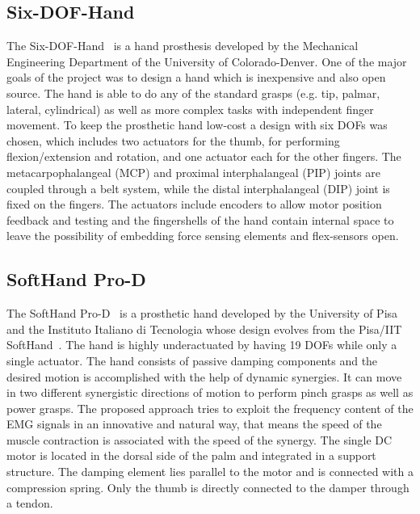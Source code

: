 \documentclass[a4paper, 10pt, conference]{ieeeconf}      %
\begin{document}
\subsection{Six-DOF-Hand}

The Six-DOF-Hand~\cite{6dofhand} is a hand prosthesis developed by the Mechanical Engineering Department of the University of Colorado-Denver. One of the major goals of the project was to design a hand which is inexpensive and also open source. The hand is able to do any of the standard grasps (e.g. tip, palmar, lateral, cylindrical) as well as more complex tasks with independent finger movement. To keep the prosthetic hand low-cost a design with six DOFs was chosen, which includes two actuators for the thumb, for performing flexion/extension and rotation, and one actuator each for the other fingers. The metacarpophalangeal (MCP) and proximal interphalangeal (PIP) joints are coupled through a belt system, while the distal interphalangeal (DIP) joint is fixed on the fingers. The actuators include encoders to allow motor position feedback and testing and the fingershells of the hand contain internal space to leave the possibility of embedding force sensing elements and flex-sensors open.

\subsection{SoftHand Pro-D}

The SoftHand Pro-D~\cite{softhand} is a prosthetic hand developed by the University of Pisa and the Instituto Italiano di Tecnologia whose design evolves from the Pisa/IIT SoftHand~\cite{pisahand}. The hand is highly underactuated by having 19 DOFs while only a single actuator. The hand consists of passive damping components and the desired motion is accomplished with the help of dynamic synergies. It can move in two different synergistic directions of motion to perform pinch grasps as well as power grasps. The proposed approach tries to exploit the frequency content of the EMG signals in an innovative and natural way, that means the speed of the muscle contraction is associated with the speed of the synergy. The single DC motor is located in the dorsal side of the palm and integrated in a support structure. The damping element lies parallel to the motor and is connected with a compression spring. Only the thumb is directly connected to the damper through a tendon.

\newpage
\end{document}
